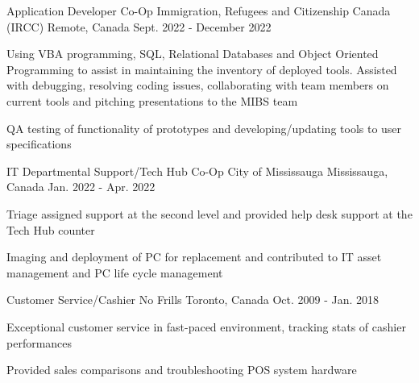 \begin{cventries}
  \cventry
    {Application Developer Co-Op}
    {Immigration, Refugees and Citizenship Canada (IRCC)}
    {Remote, Canada}
    {Sept. 2022 - December 2022}
    {
      \begin{cvitems}
        \item {Using VBA programming, SQL, Relational Databases and Object Oriented Programming to assist in maintaining the inventory of deployed tools. Assisted with debugging, resolving coding issues, collaborating with team members on current tools and pitching presentations to the MIBS team}
        \item {QA testing of functionality of prototypes and developing/updating tools to user specifications}
      \end{cvitems}
    }
      \cventry
    {IT Departmental Support/Tech Hub Co-Op}
    {City of Mississauga}
    {Mississauga, Canada}
    {Jan. 2022 - Apr. 2022}
    {
      \begin{cvitems}
        \item {Triage assigned support at the second level and provided help desk support at the Tech Hub counter}
        \item {Imaging and deployment of PC for replacement and contributed to IT asset management and PC life cycle management }
      \end{cvitems}
    }
  \cventry
    {Customer Service/Cashier}
    {No Frills}
    {Toronto, Canada}
    {Oct. 2009 - Jan. 2018}
    {
      \begin{cvitems}
        \item {Exceptional customer service in fast-paced environment, tracking stats of cashier performances}
        \item {Provided sales comparisons and troubleshooting POS system hardware}
      \end{cvitems}
    }
\end{cventries}